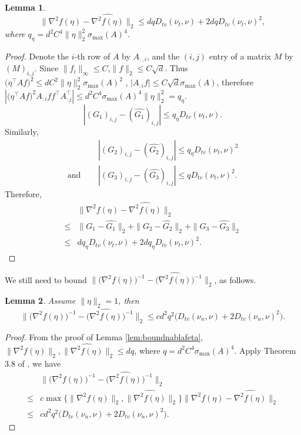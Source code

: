 \documentclass[english]{article} %
\newtheorem{lemma}{Lemma}[section]
\theoremstyle{definition}
\begin{document}
\begin{lemma}
\label{lem:nablavariation}
\[
\|\nabla^2 f(\eta) - \widehat{\nabla^2 f(\eta)}  \|_2 \le d q D_{tv}(\nu_t , \nu) + 2dq D_{tv}(\nu_t , \nu)^2,
\]
where $q_{\eta} = d^2C^4\|\eta\|_2^2\sigma_{\max}(A)^4$.
\end{lemma}
\begin{proof}
Denote the $i$-th row of $A$ by $A_{:,i}$, and the $(i,j)$ entry of a matrix $M$ by $(M)_{i,j}$. Since $\|f_i\|_\infty \le C$,$\|f\|_2 \le C\sqrt{d}$. 
Thus $\big(\eta^{\top}Af\big)^2 \le d C^2\|\eta\|_2^2\sigma_{\max}(A)^2$ 
,  $|A_{:i}f| \le C\sqrt{d}\sigma_{\max}(A)$, 
therefore $|\big(\eta^{\top}Af\big)^2 A_{:i}ff^{\top} A_{:j}^{\top}| \le d^2C^4\sigma_{\max}(A)^4 \|\eta\|_2^2 = q_{\eta}$.
\[
|(G_1)_{i,j} - (\widehat{G_1})_{i,j} | \le q_{\eta} D_{tv}(\nu_t , \nu).
\]
Similarly, 
\begin{align*}
& |(G_2)_{i,j} - (\widehat{G_2})_{i,j} | \le q_{\eta} D_{tv}(\nu_t , \nu)^2 \\
\text{and } \quad & |(G_3)_{i,j} - (\widehat{G_3})_{i,j} | \le q D_{tv}(\nu_t , \nu)^2.
\end{align*}
Therefore,
\begin{align*}
	& \|\nabla^2 f(\eta) - \widehat{\nabla^2 f(\eta)}  \|_2 \\
\le & \|G_1 - \widehat{G_1}\|_2 + \|G_2 - \widehat{G_2}\|_2 + \|G_3 - \widehat{G_3}\|_2 \\
\le & d q_{\eta} D_{tv}(\nu_t , \nu) + 2dq_{\eta} D_{tv}(\nu_t , \nu)^2.
\end{align*}
\end{proof}

We still need to bound $\|\big(\nabla^2 f(\eta)\big)^{-1} - \big(\widehat{\nabla^2 f(\eta)}\big)^{-1}  \|_2 $, as follows.
\begin{lemma}
Assume $\|\eta\|_2 = 1$, then 
\[
\|\big(\nabla^2 f(\eta)\big)^{-1} - \big(\widehat{\nabla^2 f(\eta)}\big)^{-1}  \|_2 \le cd^2q^2\big(D_{tv}(\nu_n , \nu) + 2D_{tv}(\nu_n , \nu)^2\big).
\]
\end{lemma}
\begin{proof}
From the proof of Lemma \ref{lem:boundnablafeta}, $\|\nabla^2 f(\eta)\|_2, \|\widehat{\nabla^2 f(\eta)}\|_2 \le dq$, where $q = d^2C^4\sigma_{\max}(A)^4$.
Apply Theorem 3.8 of \citep*{stewart1990matrix}, we have 
\begin{align*}
& \|\big(\nabla^2 f(\eta)\big)^{-1} - \big(\widehat{\nabla^2 f(\eta)}\big)^{-1}  \|_2 \\
\le & c\max\{\|\nabla^2 f(\eta)\|_2, \|\widehat{\nabla^2 f(\eta)}\|_2\} \|\nabla^2 f(\eta) - \widehat{\nabla^2 f(\eta)}\|_2 \\
\le & cd^2q^2\big(D_{tv}(\nu_n , \nu) + 2D_{tv}(\nu_n , \nu)^2\big).
\end{align*}

\end{proof}
\fi
\end{document}
